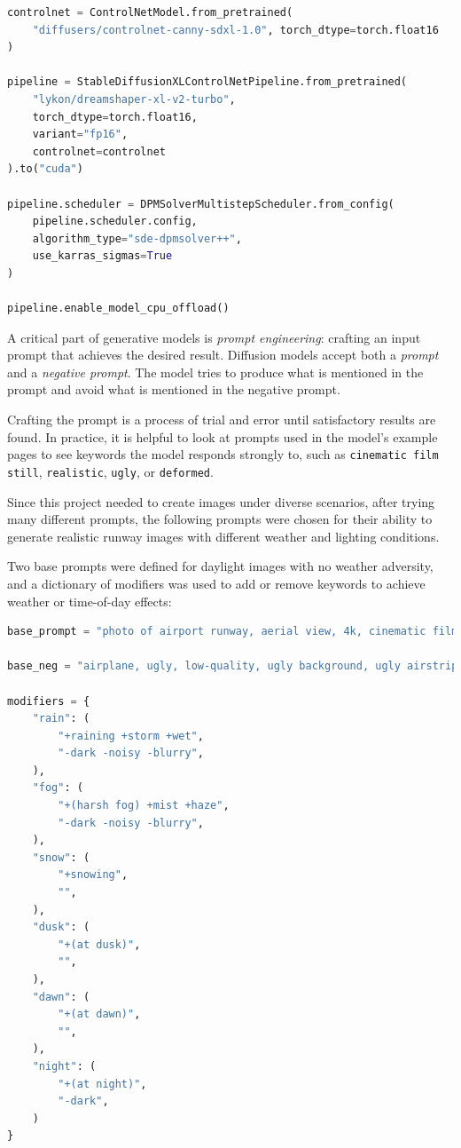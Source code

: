 \begin{lstlisting}[language=Python, caption={Base Image generation module,
model and scheduler configuration}]
controlnet = ControlNetModel.from_pretrained(
    "diffusers/controlnet-canny-sdxl-1.0", torch_dtype=torch.float16
)

pipeline = StableDiffusionXLControlNetPipeline.from_pretrained(
    "lykon/dreamshaper-xl-v2-turbo",
    torch_dtype=torch.float16,
    variant="fp16",
    controlnet=controlnet
).to("cuda")

pipeline.scheduler = DPMSolverMultistepScheduler.from_config(
    pipeline.scheduler.config,
    algorithm_type="sde-dpmsolver++",
    use_karras_sigmas=True
)

pipeline.enable_model_cpu_offload()
\end{lstlisting}

A critical part of generative models is \emph{prompt engineering}: crafting an input prompt that achieves the desired result. 
Diffusion models accept both a \emph{prompt} and a \emph{negative prompt}. 
The model tries to produce what is mentioned in the prompt and avoid what is mentioned in the negative prompt.

Crafting the prompt is a process of trial and error until satisfactory results are found. 
In practice, it is helpful to look at prompts used in the model's example pages to see keywords the model responds strongly to, such as \texttt{cinematic film still}, \texttt{realistic}, \texttt{ugly}, or \texttt{deformed}.

Since this project needed to create images under diverse scenarios, after trying
many different prompts, the following prompts were chosen for their ability to
generate realistic runway images with different weather and lighting conditions.

Two base prompts were defined for daylight images with no weather adversity, and a dictionary of modifiers was used to add or remove keywords to achieve weather or time-of-day effects:

\begin{lstlisting}[language=Python, caption={Base Image generation module,
prompt definitions}]
base_prompt = "photo of airport runway, aerial view, 4k, cinematic film still, realistic, beautiful landscape around, high-contrast runway lines"

base_neg = "airplane, ugly, low-quality, ugly background, ugly airstrip, deformed, dark, noisy, blurry, low contrast, missing lines, unrealistic, drawing, objects on runway"

modifiers = {
    "rain": (
        "+raining +storm +wet",
        "-dark -noisy -blurry",
    ),
    "fog": (
        "+(harsh fog) +mist +haze",
        "-dark -noisy -blurry",
    ),
    "snow": (
        "+snowing",
        "",
    ),
    "dusk": (
        "+(at dusk)",
        "",
    ),
    "dawn": (
        "+(at dawn)",
        "",
    ),
    "night": (
        "+(at night)",
        "-dark",
    )
}
\end{lstlisting}

